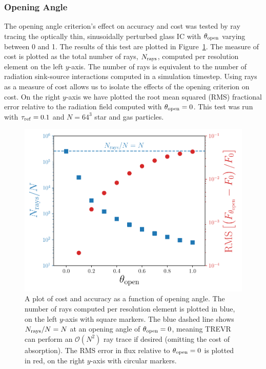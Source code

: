 \documentclass[fleq,usenatbib]{mnras}
\newcommand{\acro}{TREVR}
\newcommand{\bigO}[1]{\mathcal{O}\left(#1\right)}
\newcommand{\tr}{\tau_{\rm ref}}
\newcommand{\tO}{\theta_{\rm open}}
\begin{document}
{\subsubsection{Opening Angle}
The opening angle criterion's effect on accuracy and cost was tested by 
ray tracing the optically thin, sinusoidally perturbed glass IC with $\tO$ 
varying between 0 and 1. The results of this test are plotted in 
Figure~\ref{fig:openangle}. The measure of cost is plotted as the total number 
of rays, $N_{\rm rays}$, computed per resolution element on the left $y$-axis. 
The number of rays is equivalent to the number of radiation sink-source 
interactions computed in a simulation timestep. Using rays as a measure of 
cost allows us to isolate the effects of the opening criterion on cost. On 
the right $y$-axis we have plotted the root mean squared (RMS) fractional 
error relative to the radiation field computed with $\tO=0$. This test was run 
with $\tr = 0.1$ and $N=64^3$ star and gas particles.
\begin{figure}
\includegraphics[width=1\linewidth]{Figures/opening_angle.pdf}
\caption{A plot of cost and accuracy as a function of opening angle. The 
number of rays computed per resolution element is plotted in blue, on the left 
$y$-axis with square markers. The blue dashed line shows $N_{\rm rays}/N 
= N$ at an opening angle of $\tO=0$, meaning \acro{} can perform an 
$\bigO{N^2}$ ray trace if desired (omitting the cost of absorption). The RMS 
error in flux relative to $\tO=0$ is plotted in red, on the right $y$-axis 
with circular markers.}
\label{fig:openangle}
\end{figure}

}
\end{document}
